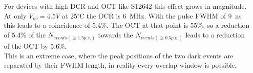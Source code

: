 \documentclass[12pt,article,type=msc,colorback,accentcolor=tud9c]{tudthesis}
\begin{document}
For devices with high DCR and OCT like S12642 this effect grows in magnitude. At only $V_{ov}=4.5V$ at 25$^\circ$C the DCR is 6~MHz. With the pulse FWHM of 9~ns this leads to a coincidence of 5.4$\%$. The OCT at that point is 55$\%$, so a reduction of 5.4$\%$ of the $N_{events(\geq 1.5p.e.)}$ towards the $N_{events(\geq 0.5p.e.)}$ leads to a reduction of the OCT by 5.6$\%$.\\

This is an extreme case, where the peak positions of the two dark events are separated by their FWHM length, in reality every overlap window is possible.




\clearpage
\newpage



\end{document}
